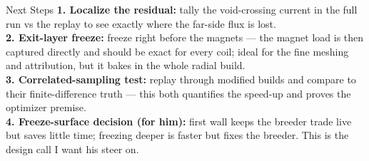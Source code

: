 \documentclass[aspectratio=169]{beamer}
\newcommand{\lab}[1]{\textcolor{acc}{\textbf{#1}}}
\begin{document}
\begin{frame}{Next Steps}
  \small
  \lab{1. Localize the residual:} tally the void-crossing current in the full run vs the replay to see exactly where the far-side flux is lost.\\[3pt]
  \lab{2. Exit-layer freeze:} freeze right before the magnets --- the magnet load is then captured directly and should be exact for every coil; ideal for the fine meshing and attribution, but it bakes in the whole radial build.\\[3pt]
  \lab{3. Correlated-sampling test:} replay through modified builds and compare to their finite-difference truth --- this both quantifies the speed-up and proves the optimizer premise.\\[3pt]
  \lab{4. Freeze-surface decision (for him):} first wall keeps the breeder trade live but saves little time; freezing deeper is faster but fixes the breeder. This is the design call I want his steer on.
\end{frame}
\end{document}
